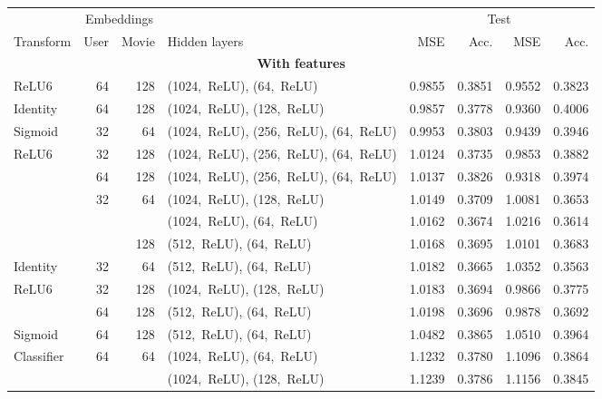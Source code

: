 \begin{table}
\centering
\begin{tabular}{lrr>{\raggedright\arraybackslash}p{3.6cm}rrrr}
\toprule
           & \multicolumn{2}{c}{Embeddings} &     &  \multicolumn{2}{c}{CV} & \multicolumn{2}{c}{Test} \\
           \cmidrule(lr){2-3}\cmidrule(lr){5-6}\cmidrule(l){7-8}
Transform & User & Movie & Hidden layers &  MSE & Acc. & MSE & Acc.  \\
\midrule
\multicolumn{8}{c}{\textbf{With features}}\\\addlinespace
ReLU6 & 64 & 128 & (1024,~ReLU), (64,~ReLU) &  0.9855 &      0.3851 &   0.9552 &        0.3823 \\
Identity & 64 & 128 & (1024,~ReLU), (128,~ReLU) &  0.9857 &      0.3778 &   0.9360 &        0.4006 \\
Sigmoid & 32 & 64  & (1024,~ReLU), (256,~ReLU), (64,~ReLU) &  0.9953 &      0.3803 &   0.9439 &        0.3946 \\
ReLU6 & 32 & 128 & (1024,~ReLU), (256,~ReLU), (64,~ReLU) &  1.0124 &      0.3735 &   0.9853 &        0.3882 \\
           & 64 & 128 & (1024,~ReLU), (256,~ReLU), (64,~ReLU) &  1.0137 &      0.3826 &   0.9318 &        0.3974 \\
           & 32 & 64  & (1024,~ReLU), (128,~ReLU) &  1.0149 &      0.3709 &   1.0081 &        0.3653 \\
           &    &     & (1024,~ReLU), (64,~ReLU) &  1.0162 &      0.3674 &   1.0216 &        0.3614 \\
           &    & 128 & (512,~ReLU), (64,~ReLU) &  1.0168 &      0.3695 &   1.0101 &        0.3683 \\
Identity & 32 & 64  & (512,~ReLU), (64,~ReLU) &  1.0182 &      0.3665 &   1.0352 &        0.3563 \\
ReLU6 & 32 & 128 & (1024,~ReLU), (128,~ReLU) &  1.0183 &      0.3694 &   0.9866 &        0.3775 \\
           & 64 & 128 & (512,~ReLU), (64,~ReLU) &  1.0198 &      0.3696 &   0.9878 &        0.3692 \\
Sigmoid & 64 & 128 & (512,~ReLU), (64,~ReLU) &  1.0482 &      0.3865 &   1.0510 &        0.3964 \\
Classifier & 64 & 64  & (1024,~ReLU), (64,~ReLU) &  1.1232 &      0.3780 &   1.1096 &        0.3864 \\
           &    &     & (1024,~ReLU), (128,~ReLU) &  1.1239 &      0.3786 &   1.1156 &        0.3845 \\

\end{tabular}
\end{table}
